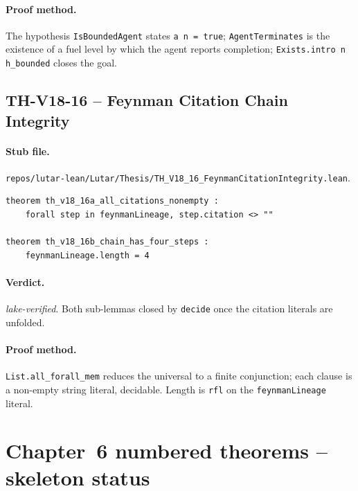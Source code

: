 \paragraph{Proof method.} The hypothesis \texttt{IsBoundedAgent}
states \texttt{a n = true}; \texttt{AgentTerminates} is the existence
of a fuel level by which the agent reports completion;
\texttt{Exists.intro n h\_bounded} closes the goal.

\subsection{TH-V18-16 -- Feynman Citation Chain Integrity}
\label{sub:thv18-16}

\paragraph{Stub file.}
\texttt{repos/lutar-lean/Lutar/Thesis/TH\_V18\_16\_FeynmanCitationIntegrity.lean}.

\begin{theorem}
\label{thm:thv18-16}
\begin{verbatim}
theorem th_v18_16a_all_citations_nonempty :
    forall step in feynmanLineage, step.citation <> ""

theorem th_v18_16b_chain_has_four_steps :
    feynmanLineage.length = 4
\end{verbatim}
\end{theorem}

\paragraph{Verdict.} \emph{lake-verified}. Both sub-lemmas closed
by \texttt{decide} once the citation literals are unfolded.

\paragraph{Proof method.} \texttt{List.all\_forall\_mem} reduces
the universal to a finite conjunction; each clause is a non-empty
string literal, decidable. Length is \texttt{rfl} on the
\texttt{feynmanLineage} literal.

\section{Chapter~6 numbered theorems -- skeleton status}
\label{sec:ch6-skeletons}

